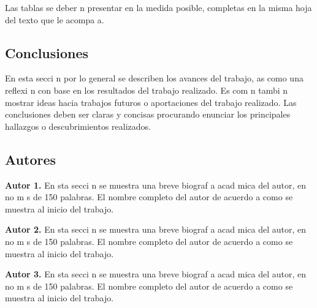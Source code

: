 \documentclass{article}
\begin{document}
        Las tablas se deber n presentar en la medida posible, completas en la misma hoja del texto que le acompa a.



\begin{center}
    \section{Conclusiones}
\end{center}

        En esta secci n por lo general se describen los avances del trabajo, as  como una reflexi n con base en los resultados del trabajo realizado. Es com n tambi n mostrar ideas hacia trabajos futuros o aportaciones del trabajo realizado. Las conclusiones deben ser claras y concisas procurando enunciar los principales hallazgos o descubrimientos realizados.



\vspace{0.5cm}
\nocite{*}



\begin{center}
    \section*{Autores}
\end{center}

    \textbf{Autor 1.} En  sta secci n se muestra una breve biograf a acad mica del autor, en no m s de 150 palabras. El nombre completo del autor de acuerdo a como se muestra al inicio del trabajo.

    \textbf{Autor 2.} En  sta secci n se muestra una breve biograf a acad mica del autor, en no m s de 150 palabras. El nombre completo del autor de acuerdo a como se muestra al inicio del trabajo.

    \textbf{Autor 3.} En  sta secci n se muestra una breve biograf a acad mica del autor, en no m s de 150 palabras. El nombre completo del autor de acuerdo a como se muestra al inicio del trabajo.
\end{document}
